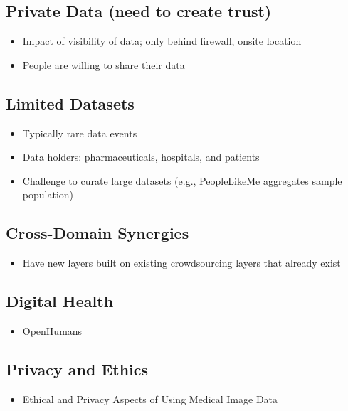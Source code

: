 \documentclass[10pt,twocolumn,letterpaper]{article}
\begin{document}
\subsection{Private Data (need to create trust)}
\begin{itemize}
    \item Impact of visibility of data; only behind firewall, onsite location
    \item People are willing to share their data
\end{itemize}

\subsection{Limited Datasets}
\begin{itemize}
    \item Typically rare data events
    \item Data holders: pharmaceuticals, hospitals, and patients
    \item Challenge to curate large datasets (e.g., PeopleLikeMe aggregates sample population)
\end{itemize}

\subsection{Cross-Domain Synergies}
\begin{itemize}
    \item Have new layers built on existing crowdsourcing layers that already exist
\end{itemize}

\subsection{Digital Health}
\begin{itemize}
    \item OpenHumans
\end{itemize}

\subsection{Privacy and Ethics}
\begin{itemize}
    \item   Ethical and Privacy Aspects of Using Medical Image Data %
\end{itemize}
\end{document}
